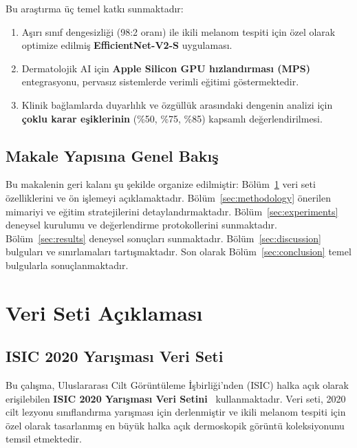 \documentclass[12pt,a4paper]{article}
\begin{document}
Bu araştırma üç temel katkı sunmaktadır:

\begin{enumerate}
    \item Aşırı sınıf dengesizliği (98:2 oranı) ile ikili melanom tespiti için özel olarak optimize edilmiş \textbf{EfficientNet-V2-S} uygulaması.
    
    \item Dermatolojik AI için \textbf{Apple Silicon GPU hızlandırması (MPS)} entegrasyonu, pervasız sistemlerde verimli eğitimi göstermektedir.
    
    \item Klinik bağlamlarda duyarlılık ve özgüllük arasındaki dengenin analizi için \textbf{çoklu karar eşiklerinin} (\%50, \%75, \%85) kapsamlı değerlendirilmesi.
\end{enumerate}

\subsection{Makale Yapısına Genel Bakış}

Bu makalenin geri kalanı şu şekilde organize edilmiştir: Bölüm~\ref{sec:dataset} veri seti özelliklerini ve ön işlemeyi açıklamaktadır. Bölüm~\ref{sec:methodology} önerilen mimariyi ve eğitim stratejilerini detaylandırmaktadır. Bölüm~\ref{sec:experiments} deneysel kurulumu ve değerlendirme protokollerini sunmaktadır. Bölüm~\ref{sec:results} deneysel sonuçları sunmaktadır. Bölüm~\ref{sec:discussion} bulguları ve sınırlamaları tartışmaktadır. Son olarak Bölüm~\ref{sec:conclusion} temel bulgularla sonuçlanmaktadır.

\section{Veri Seti Açıklaması}
\label{sec:dataset}

\subsection{ISIC 2020 Yarışması Veri Seti}

Bu çalışma, Uluslararası Cilt Görüntüleme İşbirliği'nden (ISIC) halka açık olarak erişilebilen \textbf{ISIC 2020 Yarışması Veri Setini}~\cite{rotemberg2021} kullanmaktadır. Veri seti, 2020 cilt lezyonu sınıflandırma yarışması için derlenmiştir ve ikili melanom tespiti için özel olarak tasarlanmış en büyük halka açık dermoskopik görüntü koleksiyonunu temsil etmektedir.
\end{document}
